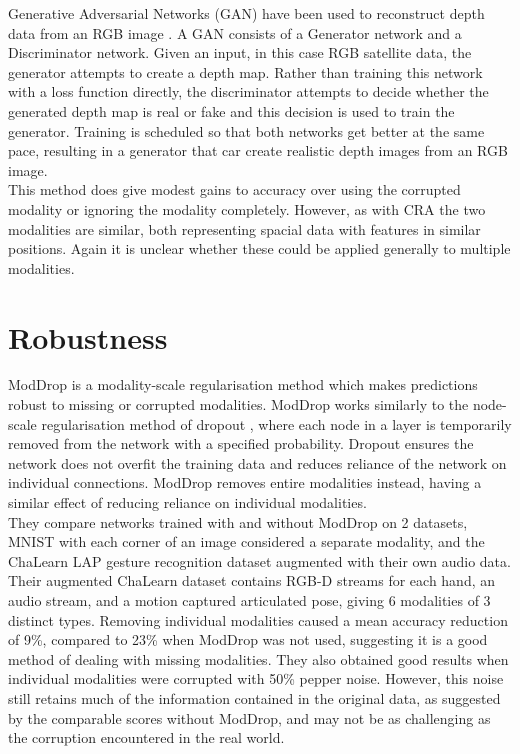 Generative Adversarial Networks (GAN) have been used to reconstruct depth data from an RGB image \cite{GANFootprint}. A GAN consists of a Generator network and a Discriminator network. Given an input, in this case RGB satellite data, the generator attempts to create a depth map. Rather than training this network with a loss function directly, the discriminator attempts to decide whether the generated depth map is real or fake and this decision is used to train the generator. Training is scheduled so that both networks get better at the same pace, resulting in a generator that car create realistic depth images from an RGB image. \\

This method does give modest gains to accuracy over using the corrupted modality or ignoring the modality completely. However, as with CRA the two modalities are similar, both representing spacial data with features in similar positions. Again it is unclear whether these could be applied generally to multiple modalities.\\

\section{Robustness}
ModDrop \cite{ModDrop} is a modality-scale regularisation method which makes predictions robust to missing or corrupted modalities. ModDrop works similarly to the node-scale regularisation method of dropout \cite{dropout}, where each node in a layer is temporarily removed from the network with a specified probability. Dropout ensures the network does not overfit the training data and reduces reliance of the network on individual connections. ModDrop removes entire modalities instead, having a similar effect of reducing reliance on individual modalities. \\

They compare networks trained with and without ModDrop on 2 datasets, MNIST with each corner of an image considered a separate modality, and the ChaLearn LAP gesture recognition dataset augmented with their own audio data. Their augmented ChaLearn dataset contains RGB-D streams for each hand, an audio stream, and a motion captured articulated pose, giving 6 modalities of 3 distinct types. Removing individual modalities caused a mean accuracy reduction of 9\%, compared to 23\% when ModDrop was not used, suggesting it is a good method of dealing with missing modalities. They also obtained good results when individual modalities were corrupted with 50\% pepper noise. However, this noise still retains much of the information contained in the original data, as suggested by the comparable scores without ModDrop, and may not be as challenging as the corruption encountered in the real world.\\